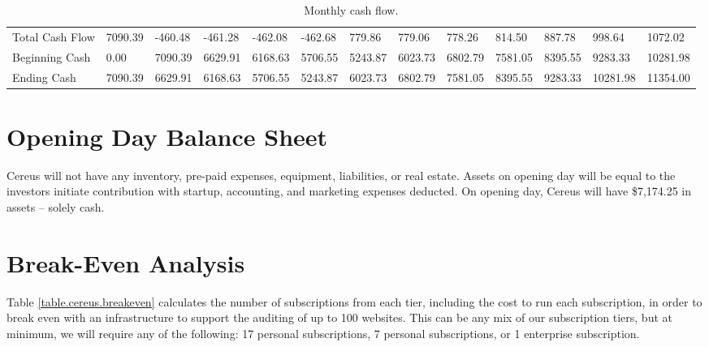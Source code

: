 \begin{sidewaystable}
\begin{table}[H]
\begin{tabularx}{\textwidth}{X X X X X X X X X X X X X}
    \multicolumn{1}{l}{Total Cash Flow} & 7090.39 & -460.48 & -461.28 & -462.08 & -462.68 & 779.86 & 779.06 & 778.26 & 814.50 & 887.78 & 998.64 & 1072.02  \\
    \multicolumn{1}{l}{Beginning Cash} & 0.00 & 7090.39 & 6629.91 & 6168.63 & 5706.55 & 5243.87 & 6023.73 & 6802.79 & 7581.05 & 8395.55 & 9283.33 & 10281.98  \\
    \multicolumn{1}{l}{Ending Cash} & 7090.39 & 6629.91 & 6168.63 & 5706.55 & 5243.87 & 6023.73 & 6802.79 & 7581.05 & 8395.55 & 9283.33 & 10281.98 & 11354.00  \\

  \end{tabularx}
  \caption{Monthly cash flow.}
  \label{table.cash.flow}
\end{table}
\end{sidewaystable}

\section{Opening Day Balance Sheet}

Cereus will not have any inventory, pre-paid expenses, equipment, liabilities, or real estate. Assets on opening day will be equal to the investors initiate contribution with startup, accounting, and marketing expenses deducted. On opening day, Cereus will have \$7,174.25 in assets -- solely cash.

\section{Break-Even Analysis}

Table \ref{table.cereus.breakeven} calculates the number of subscriptions from each tier, including the cost to run each subscription, in order to break even with an infrastructure to support the auditing of up to 100 websites. This can be any mix of our subscription tiers, but at minimum, we will require any of the following: 17 personal subscriptions, 7 personal subscriptions, or 1 enterprise subscription.
